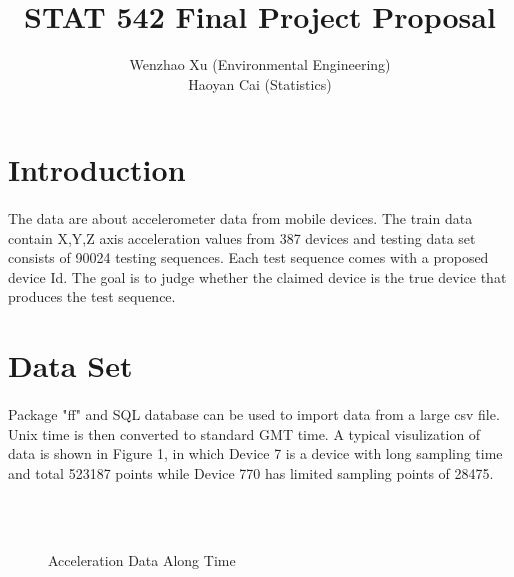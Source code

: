 \documentclass{article}
\author{Wenzhao Xu (Environmental Engineering)\\ Haoyan Cai (Statistics) }
\title{STAT 542 Final Project Proposal}
\begin{document}
	\maketitle
	
	\section{Introduction} %
	\label{sec:introduction}
	
	\paragraph{} The data are about accelerometer data from mobile devices. The train data contain X,Y,Z axis acceleration values from 387 devices and testing data set consists of 90024 testing sequences. Each test sequence comes with a proposed device Id. The goal is to judge whether the claimed device is the true device that produces the test sequence. 
	
	\section{Data Set} %
	\label{sec:section_name}
	\paragraph{}
	Package "ff" and SQL database can be used to import data from a large csv file. Unix time is then converted to standard GMT time. A typical visulization of data is shown in Figure 1, in which Device 7 is a device with long sampling time and total 523187 points while Device 770 has limited sampling points of 28475. 
	\begin{figure}
		\centering
		\\
		 \\
		\caption{Acceleration Data Along Time}
	\end{figure}
	
\end{document}

